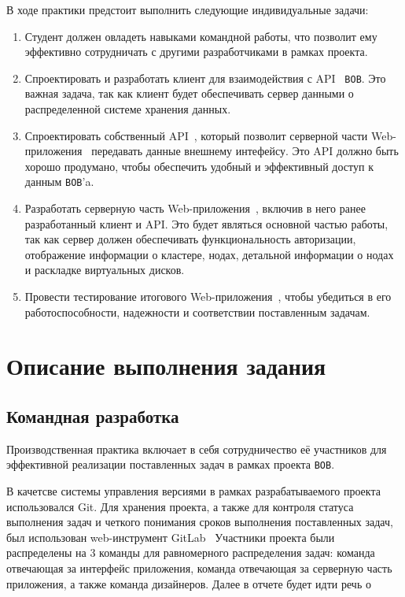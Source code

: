 В ходе практики предстоит выполнить следующие индивидуальные задачи:
\begin{enumerate}
  \item Студент должен овладеть навыками командной работы, что позволит ему эффективно сотрудничать с другими разработчиками в рамках проекта.
  \item Спроектировать и разработать клиент для взаимодействия с API~\cite{api} \texttt{BOB}. Это важная задача, так как клиент будет обеспечивать сервер данными о распределенной системе хранения данных.
  \item Спроектировать собственный API~\cite{api}, который позволит серверной части Web-приложения~\cite{web} передавать данные внешнему интефейсу. Это API должно быть хорошо продумано, чтобы обеспечить удобный и эффективный доступ к данным \texttt{BOB}'a.
  \item Разработать серверную часть Web-приложения~\cite{web}, включив в него ранее разработанный клиент и API. Это будет являться основной частью работы, так как сервер должен обеспечивать функциональность авторизации, отображение информации о кластере, нодах, детальной информации о нодах и раскладке виртуальных дисков.
  \item Провести тестирование итогового Web-приложения~\cite{web}, чтобы убедиться в его работоспособности, надежности и соответствии поставленным задачам. 
\end{enumerate}

\section{Описание выполнения задания}

\subsection{Командная разработка}

Производственная практика включает в себя сотрудничество её участников для эффективной реализации поставленных задач в рамках проекта \texttt{BOB}.

В качетсве системы управления версиями в рамках разрабатываемого проекта использовался Git.
Для хранения проекта, а также для контроля статуса выполнения задач и четкого понимания сроков выполнения поставленных задач, был использован web-инструмент GitLab~\cite{gitlab}
Участники проекта были распределены на 3 команды для равномерного распределения задач: команда отвечающая за интерфейс приложения, команда отвечающая за серверную часть приложения, а также команда дизайнеров.
Далее в отчете будет идти речь о 
